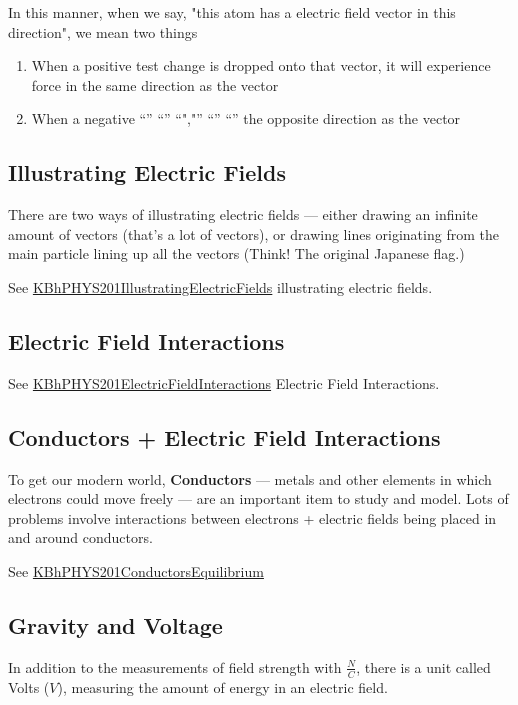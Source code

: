 \documentclass[letterpaper]{article}
\begin{document}
In this manner, when we say, "this atom has a electric field vector in
this direction", we mean two things

\begin{enumerate}
\item When a positive test change is dropped onto that vector, it will
experience force in the same direction as the vector
\item When a negative “” “” “","” “” “” the opposite direction as the
vector
\end{enumerate}

\subsection{Illustrating Electric Fields}
\label{sec:orgaadf9b1}
There are two ways of illustrating electric fields --- either drawing an
infinite amount of vectors (that's a lot of vectors), or drawing lines
originating from the main particle lining up all the vectors (Think! The
original Japanese flag.)

See
\href{KBhPHYS201IllustratingElectricFields.org}{KBhPHYS201IllustratingElectricFields}
illustrating electric fields.

\subsection{Electric Field Interactions}
\label{sec:org6c1f929}
See
\href{KBhPHYS201ElectricFieldInteractions.org}{KBhPHYS201ElectricFieldInteractions}
Electric Field Interactions.

\subsection{Conductors + Electric Field Interactions}
\label{sec:org6ae40e4}
To get our modern world, \textbf{Conductors} --- metals and other elements in
which electrons could move freely --- are an important item to study and
model. Lots of problems involve interactions between electrons +
electric fields being placed in and around conductors.

See
\href{KBhPHYS201ConductorsEquilibrium.org}{KBhPHYS201ConductorsEquilibrium}

\subsection{Gravity and Voltage}
\label{sec:orge87c516}
In addition to the measurements of field strength with \(\frac{N}{C}\),
there is a unit called Volts (\(V\)), measuring the amount of energy in
an electric field.
\end{document}
